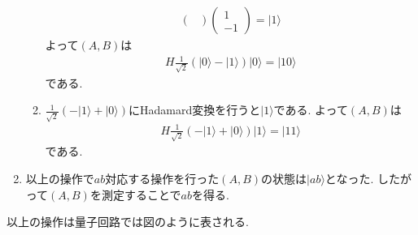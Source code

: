 \documentclass[uplatex,a4j,11pt,dvipdfmx]{jsarticle}
\begin{document}
\begin{enumerate}
\begin{enumerate}
\begin{align}
\begin{pmatrix}
      \end{pmatrix}\begin{pmatrix}
        1\\-1
      \end{pmatrix}=|1\rangle
    \end{align}
    よって$(A,B)$は
    \begin{align}
      H\frac{1}{\sqrt{2}}(|0\rangle-|1\rangle)|0\rangle=|10\rangle
    \end{align}
    である.
    \item $\frac{1}{\sqrt{2}}(-|1\rangle+|0\rangle)$にHadamard変換を行うと$|1\rangle$である.
    よって$(A,B)$は
    \begin{align}
      H\frac{1}{\sqrt{2}}(-|1\rangle+|0\rangle)|1\rangle=|11\rangle
    \end{align}
    である.
  \end{enumerate}
  \item 以上の操作で$ab$対応する操作を行った$(A,B)$の状態は$|ab\rangle$となった.
  したがって$(A,B)$を測定することで$ab$を得る.
\end{enumerate}
以上の操作は量子回路では図のように表される.

\end{document}
